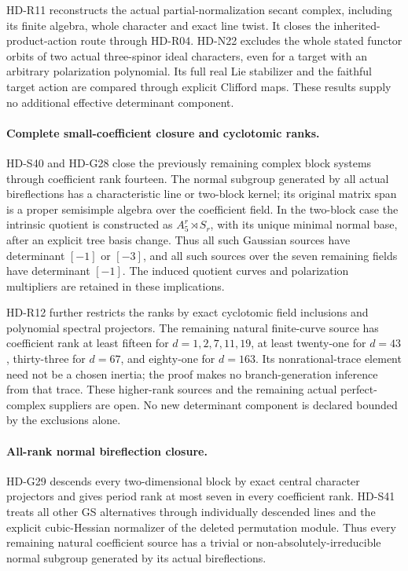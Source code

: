 HD-R11 reconstructs the actual partial-normalization secant complex,
including its finite algebra, whole character and exact line twist.
It closes the inherited-product-action route through HD-R04.
HD-N22 excludes the whole stated functor orbits of two actual
three-spinor ideal characters, even for a target with an arbitrary
polarization polynomial. Its full real Lie stabilizer and the
faithful target action are compared through explicit Clifford maps.
These results supply no additional effective determinant component.

\paragraph{Complete small-coefficient closure and cyclotomic ranks.}
HD-S40 and HD-G28 close the previously remaining complex block
systems through coefficient rank fourteen. The normal subgroup
generated by all actual bireflections has a characteristic line
or two-block kernel; its original matrix span is a proper
semisimple algebra over the coefficient field. In the two-block
case the intrinsic quotient is constructed as
\(A_5^r\rtimes S_r\), with its unique minimal normal base,
after an explicit tree basis change. Thus all such Gaussian
sources have determinant \([-1]\) or \([-3]\), and all
such sources over the seven remaining fields have determinant
\([-1]\). The induced quotient curves and polarization
multipliers are retained in these implications.

HD-R12 further restricts the ranks by exact cyclotomic field
inclusions and polynomial spectral projectors. The remaining
natural finite-curve source has coefficient rank at least fifteen
for \(d=1,2,7,11,19\), at least twenty-one for \(d=43\),
thirty-three for \(d=67\), and eighty-one for \(d=163\).
Its nonrational-trace element need not be a chosen inertia;
the proof makes no branch-generation inference from that trace.
These higher-rank sources and the remaining actual perfect-complex
suppliers are open. No new determinant component is declared
bounded by the exclusions alone.

\paragraph{All-rank normal bireflection closure.}
HD-G29 descends every two-dimensional block by exact central
character projectors and gives period rank at most seven in
every coefficient rank. HD-S41 treats all other GS alternatives
through individually descended lines and the explicit cubic-Hessian
normalizer of the deleted permutation module. Thus every remaining
natural coefficient source has a trivial or non-absolutely-irreducible
normal subgroup generated by its actual bireflections.

